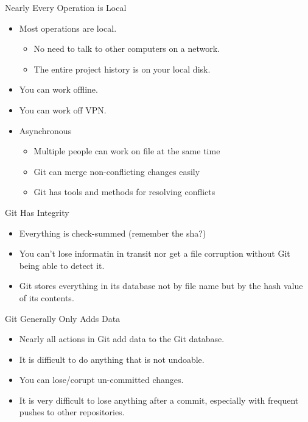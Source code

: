 \begin{frame}[t]{Nearly Every Operation is Local}
  \begin{itemize}
    \item Most operations are local.
      \begin{itemize}
        \item No need to talk to other computers on a network.
        \item The entire project history is on your local disk.
      \end{itemize}

    \item You can work offline.
    \item You can work off VPN.  

    \item Asynchronous
      \begin{itemize}
        \item Multiple people can work on file at the same time
        \item Git can merge non-conflicting changes easily
        \item Git has tools and methods for resolving conflicts
      \end{itemize}
  \end{itemize}
\end{frame}

\begin{frame}[t]{Git Has Integrity}
  \begin{itemize}
    \item Everything is check-summed (remember the sha?)
    \item You can't lose informatin in transit nor get a file corruption without
      Git being able to detect it.
    \item Git stores everything in its database not by file name but by the hash
      value of its contents.
  \end{itemize}
\end{frame}

\begin{frame}[t]{Git Generally Only Adds Data}
  \begin{itemize}
    \item Nearly all actions in Git add data to the Git database.
    \item It is difficult to do anything that is not undoable.
    \item You can lose/corupt un-committed changes.
    \item It is very difficult to lose anything after a commit, especially with
      frequent pushes to other repositories.
  \end{itemize}
\end{frame}

